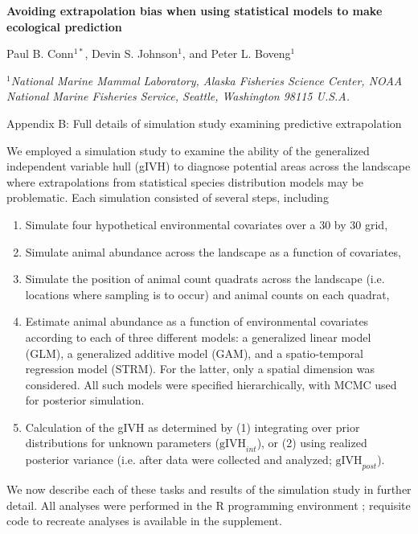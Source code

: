 \documentclass[12pt,fleqn]{article}
\begin{document}
\begin{center} \bf {\large Avoiding extrapolation bias when using statistical models to make ecological prediction}

\vspace{0.7cm}
Paul B. Conn$^{1*}$, Devin S. Johnson$^1$, and Peter L. Boveng$^1$
\end{center}
\vspace{0.5cm}

\rm
\small

\it $^1$National Marine Mammal Laboratory, Alaska Fisheries Science Center,
NOAA National Marine Fisheries Service,
Seattle, Washington 98115 U.S.A.\\

\rm \begin{flushleft}

\raggedbottom
\vspace{.5in}

\begin{center}
Appendix B: Full details of simulation study examining predictive extrapolation
\bigskip
\end{center}
\vspace{.3in}

\doublespacing

We employed a simulation study to examine the ability of the generalized independent variable hull (gIVH) to diagnose potential areas across the landscape where extrapolations from statistical species distribution models may be problematic.  Each simulation consisted of several steps, including
\begin{enumerate}
  \item Simulate four hypothetical environmental covariates over a 30 by 30 grid,
  \item Simulate animal abundance across the landscape as a function of covariates,
  \item Simulate the position of animal count quadrats across the landscape (i.e. locations where sampling is to occur) and animal counts on each quadrat,
  \item Estimate animal abundance as a function of environmental covariates according to each of three different models: a generalized linear model (GLM), a generalized additive model (GAM), and a spatio-temporal regression model (STRM).  For the latter, only a spatial dimension was considered.  All such models were specified hierarchically, with MCMC used for posterior simulation.
  \item Calculation of the gIVH as determined by (1) integrating over prior distributions for unknown parameters ($\text{gIVH}_{int}$), or (2) using realized posterior variance (i.e. after data were collected and analyzed; $\text{gIVH}_{post}$).
\end{enumerate}
We now describe each of these tasks and results of the simulation study in further detail.  All analyses were performed in the R programming environment \citep{RTeam2012}; requisite code to recreate analyses is available in the supplement.


\end{flushleft}
\end{document}
